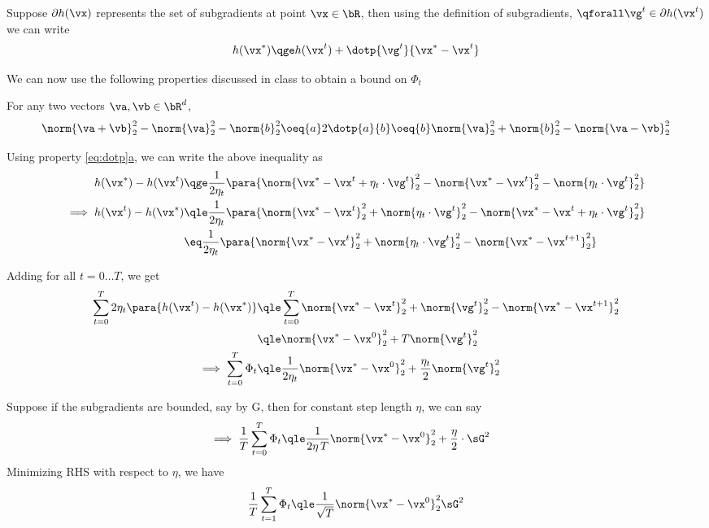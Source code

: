 \documentclass{article}
\newcommand{\x}[1]{\vx^{#1}}
\newcommand{\xs}{\vx^{\ast}}
\begin{document}
\begin{question}
	Suppose $\partial h(\vx)$ represents the set of subgradients at point $\vx \in \bR$, then using the definition of subgradients, $\qforall \vg^t \in \partial h(\x{t})$ we can write
	\begin{align*}
		h(\xs) \qge h(\x{t}) + \dotp{\vg^t}{\xs - \x{t}}
	\end{align*}

	We can now use the following properties discussed in class to obtain a bound on $\Phi_t$
	\begin{property}
		For any two vectors $\va, \vb \in \bR^d$,
		\begin{equation}
			\norm{\va + \vb}_2^2 - \norm{\va}_2^2 - \norm{b}_2^2	\oeq{a}	2\dotp{a}{b}	\oeq{b}	\norm{\va}_2^2 + \norm{b}_2^2 - \norm{\va - \vb}_2^2
			\label{eq:dotp}
		\end{equation}
	\end{property}

	Using property \hyperref[eq:dotp]{\ref*{eq:dotp}a}, we can write the above inequality as
	\begin{align*}
		h(\xs) - h(\x{t}) &\qge \frac{1}{2 \eta_t} \para{\norm{\xs - \x{t} + \eta_t \cdot \vg^t}_2^2 - \norm{\xs - \x{t}}_2^2 - \norm{\eta_t \cdot \vg^t}_2^2} \\
		\implies h(\x{t}) - h(\xs) &\qle \frac{1}{2 \eta_t} \para{\norm{\xs - \x{t}}_2^2 + \norm{\eta_t \cdot \vg^t}_2^2 - \norm{\xs - \x{t} + \eta_t \cdot \vg^t}_2^2} \\
		&\eq \frac{1}{2 \eta_t} \para{\norm{\xs - \x{t}}_2^2 + \norm{\eta_t \cdot \vg^t}_2^2 - \norm{\xs - \x{t+1}}_2^2}
	\end{align*}

	Adding for all $t = 0 \dots T$, we get
	\begin{align*}
		\sum_{t = 0}^T 2 \eta_t \para{h(\x{t}) - h(\xs)} &\qle \sum_{t = 0}^T \norm{\xs - \x{t}}_2^2 + \norm{\vg^t}_2^2 - \norm{\xs - \x{t+1}}_2^2 \\
		&\qle \norm{\xs - \x{0}}_2^2 + T \norm{\vg^t}_2^2 \\
		\implies \sum_{t = 0}^T \Phi_t &\qle \frac{1}{2 \eta_t} \norm{\xs - \x{0}}_2^2 + \frac{\eta_t}{2} \norm{\vg^t}_2^2
	\end{align*}

	Suppose if the subgradients are bounded, say by G, then for constant step length $\eta$, we can say
	\begin{align*}
		\implies \frac{1}{T} \sum_{t = 0}^T	\Phi_t	&\qle	\frac{1}{2 \eta \, T} \norm{\xs - \x{0}}_2^2 + \frac{\eta}{2} \cdot \sG^2
	\end{align*}
	Minimizing RHS with respect to $\eta$, we have
	\begin{align*}
		\frac{1}{T} \sum_{t = 1}^T \Phi_t	\qle	\frac{1}{\sqrt{T}} \norm{\xs - \x{0}}_2^2 \sG^2
	\end{align*}


\end{question}
\end{document}
